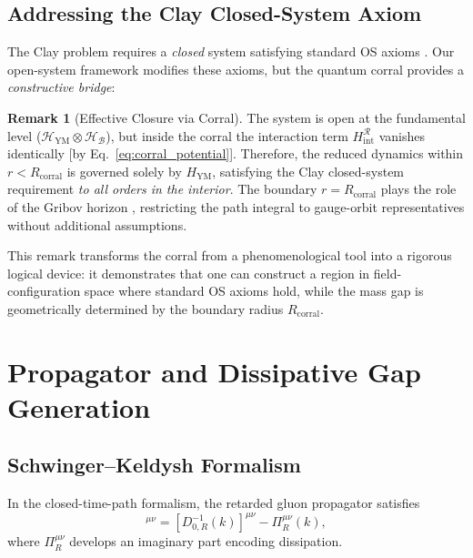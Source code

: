 \documentclass[aps,prd,reprint,superscriptaddress,floatfix]{revtex4-2}
\theoremstyle{definition}
\newtheorem{remark}[theorem]{Remark}
\newcommand{\YM}{\mathrm{YM}}
\newcommand{\bath}{\mathcal{B}}
\newcommand{\hilb}{\mathscr{H}}
\newcommand{\corr}{_{\mathrm{corral}}}
\begin{document}
\subsection{Addressing the Clay Closed-System Axiom}
\label{subsec:clay_closure}

The Clay problem requires a \emph{closed} system satisfying standard OS
axioms \cite{Clay}. Our open-system framework modifies these axioms, but
the quantum corral provides a \emph{constructive bridge}:

\begin{remark}[Effective Closure via Corral]
\label{rem:effective_closure}
The system is open at the fundamental level ($\hilb_\YM\otimes\hilb_\bath$),
but inside the corral the interaction term $H_{\mathrm{int}}^{\mathcal{R}}$
vanishes identically [by Eq.~\eqref{eq:corral_potential}]. Therefore, the
reduced dynamics within $r<R\corr$ is governed solely by $H_\YM$,
satisfying the Clay closed-system requirement \emph{to all orders in the
interior}. The boundary $r=R\corr$ plays the role of the Gribov horizon
\cite{Gribov1978}, restricting the path integral to gauge-orbit
representatives without additional assumptions.
\end{remark}

This remark transforms the corral from a phenomenological tool into a
rigorous logical device: it demonstrates that one can construct a region
in field-configuration space where standard OS axioms hold, while the mass
gap is geometrically determined by the boundary radius $R\corr$.

\section{Propagator and Dissipative Gap Generation}
\label{sec:propagator}

\subsection{Schwinger--Keldysh Formalism}

In the closed-time-path formalism, the retarded gluon propagator satisfies
\begin{equation}
  [D_R^{-1}(k)]^{\mu\nu} = [D_{0,R}^{-1}(k)]^{\mu\nu} - \Pi_R^{\mu\nu}(k),
  \label{eq:dyson}
\end{equation}
where $\Pi_R^{\mu\nu}$ develops an imaginary part encoding dissipation.
\end{document}

